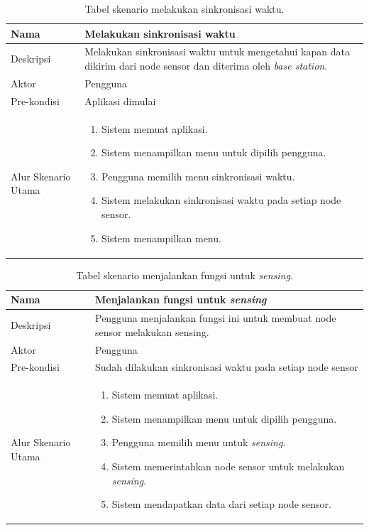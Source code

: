 \documentclass[a4paper,twoside]{article}
\begin{document}
\begin{enumerate}
\begin{table}[H]
    \centering
    \begin{tabular}{|p{3cm}|p{10cm}|}
    \hline
        Nama & Melakukan sinkronisasi waktu\\
    \hline
    \hline
        Deskripsi & Melakukan sinkronisasi waktu untuk mengetahui kapan data dikirim dari node sensor dan diterima oleh \textit{base station}. \\
    \hline
        Aktor & Pengguna \\
    \hline
        Pre-kondisi & Aplikasi dimulai \\
    \hline
        Alur Skenario Utama & 
        \begin{enumerate}
            \item Sistem memuat aplikasi.
            \item Sistem menampilkan menu untuk dipilih pengguna.
            \item Pengguna memilih menu sinkronisasi waktu.
            \item Sistem melakukan sinkronisasi waktu pada setiap node sensor.
            \item Sistem menampilkan menu.
        \end{enumerate}\\
    \hline
    \end{tabular}
    \caption{Tabel skenario melakukan sinkronisasi waktu.}
    \label{tab:skenario1}
\end{table}

\begin{table}[H]
    \centering
    \begin{tabular}{|p{3cm}|p{10cm}|}
    \hline
        Nama & Menjalankan fungsi untuk \textit{sensing}\\
    \hline
    \hline
        Deskripsi & Pengguna menjalankan fungsi ini untuk membuat node sensor melakukan sensing.\\
    \hline
        Aktor & Pengguna \\
    \hline
        Pre-kondisi & Sudah dilakukan sinkronisasi waktu pada setiap node sensor\\
    \hline
        Alur Skenario Utama & 
        \begin{enumerate}
            \item Sistem memuat aplikasi.
            \item Sistem menampilkan menu untuk dipilih pengguna.
            \item Pengguna memilih menu untuk \textit{sensing}.
            \item Sistem memerintahkan node sensor untuk melakukan \textit{sensing}.
            \item Sistem mendapatkan data dari setiap node sensor.
        \end{enumerate}\\
    \hline
    \end{tabular}
    \caption{Tabel skenario menjalankan fungsi untuk \textit{sensing}.}
    \label{tab:skenario2}
\end{table}


\end{enumerate}
\end{document}
